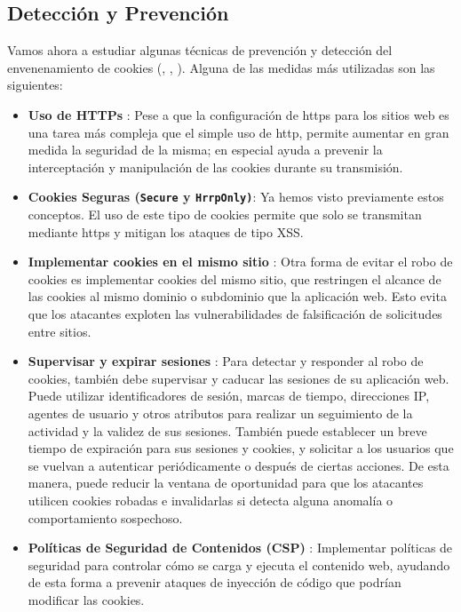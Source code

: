 \newpage

\subsection{Detección y Prevención}

Vamos ahora a estudiar algunas técnicas de prevención y detección del envenenamiento de cookies (\cite{linkedin2024cookie}, \cite{f52024cookie}, \cite{linkedin2024cookie2}). Alguna de las medidas más utilizadas son las siguientes:

\begin{itemize}
    \item \textbf{Uso de HTTPs} : Pese a que la configuración de https para los sitios web es una tarea más compleja que el simple uso de http, permite aumentar en gran medida la seguridad de la misma; en especial ayuda a prevenir la interceptación y manipulación de las cookies durante su transmisión.

    \item \textbf{Cookies Seguras (\texttt{Secure} y \texttt{HrrpOnly)}}: Ya hemos visto previamente estos conceptos. El uso de este tipo de cookies permite que solo se transmitan mediante https y mitigan los ataques de tipo XSS.

    \item \textbf{Implementar cookies en el mismo sitio} : Otra forma de evitar el robo de cookies es implementar cookies del mismo sitio, que restringen el alcance de las cookies al mismo dominio o subdominio que la aplicación web. Esto evita que los atacantes exploten las vulnerabilidades de falsificación de solicitudes entre sitios.

    \item \textbf{Supervisar y expirar sesiones} : Para detectar y responder al robo de cookies, también debe supervisar y caducar las sesiones de su aplicación web. Puede utilizar identificadores de sesión, marcas de tiempo, direcciones IP, agentes de usuario y otros atributos para realizar un seguimiento de la actividad y la validez de sus sesiones. También puede establecer un breve tiempo de expiración para sus sesiones y cookies, y solicitar a los usuarios que se vuelvan a autenticar periódicamente o después de ciertas acciones. De esta manera, puede reducir la ventana de oportunidad para que los atacantes utilicen cookies robadas e invalidarlas si detecta alguna anomalía o comportamiento sospechoso.

    \item \textbf{Políticas de Seguridad de Contenidos (CSP)} : Implementar políticas de seguridad para controlar cómo se carga y ejecuta el contenido web, ayudando de esta forma a prevenir ataques de inyección de código que podrían modificar las cookies.


\end{itemize}
